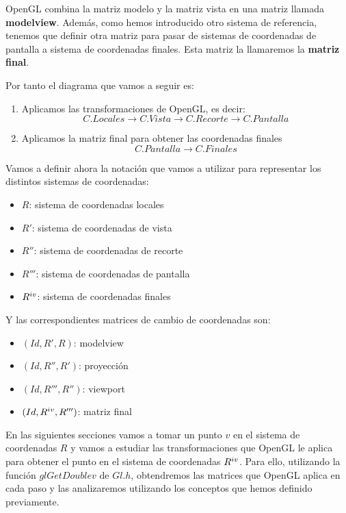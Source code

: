 \documentclass[a4paper,11pt, oneside]{book}
\begin{document}
 OpenGL combina la matriz modelo y la matriz vista en una matriz llamada \textbf{modelview}. Además, como hemos introducido otro sistema de referencia, tenemos que definir otra matriz para pasar de sistemas de coordenadas de pantalla a sistema de coordenadas finales. Esta matriz la llamaremos la \textbf{matriz final}.

Por tanto el diagrama que vamos a seguir es:

\begin{enumerate}
	\item Aplicamos las transformaciones de OpenGL, es decir:
	\begin{equation}
	C. Locales \rightarrow C. Vista \rightarrow C.Recorte \rightarrow C.Pantalla
	\end{equation}
	\item Aplicamos la matriz final para obtener las coordenadas finales
	\begin{equation}
		C.Pantalla \rightarrow C.Finales
	\end{equation}
\end{enumerate}


Vamos a definir ahora la notación que vamos a utilizar para representar los distintos sistemas de coordenadas:

\begin{itemize}
	\item $R$: sistema de coordenadas locales
	\item $R'$: sistema de coordenadas de vista
	\item $R''$: sistema de coordenadas de recorte
	\item $R'''$: sistema de coordenadas de pantalla
	\item $R^{\romannumeral 4}$: sistema de coordenadas finales
\end{itemize}

Y las correspondientes matrices de cambio de coordenadas son:

\begin{itemize}
	\item $(Id, R', R)$: modelview
	\item $(Id, R'', R')$: proyección
	\item $(Id, R''', R'')$: viewport
	\item $(Id, R^{\romannumeral 4}, R''')$: matriz final
\end{itemize}

En las siguientes secciones vamos a tomar un punto $v$ en el sistema de coordenadas $R$ y vamos a estudiar las transformaciones que OpenGL le aplica para obtener el punto en el sistema de coordenadas $R^{\romannumeral 4}$. Para ello, utilizando la función $glGetDoublev$ de $Gl.h$, obtendremos las matrices que OpenGL aplica en cada paso y las analizaremos utilizando los conceptos que hemos definido previamente.
\end{document}
